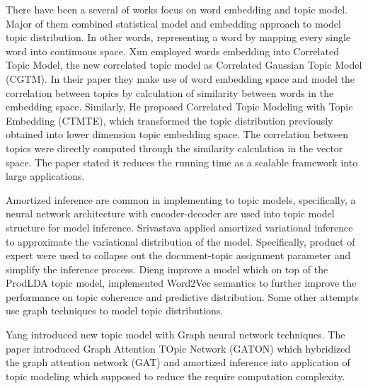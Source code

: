 There have been a several of works focus on word embedding and topic model. Major of them combined statistical model and embedding approach to model topic distribution. In other words, representing a word by mapping every single word into continuous space.
Xun \cite{he_efficient_2017} employed words embedding into Correlated Topic Model, the new correlated topic model as Correlated Gaussian Topic Model (CGTM). In their paper they make use of word embedding space and model the correlation between topics by calculation of similarity between words in the embedding space.
Similarly, He\cite{xun_correlated_nodate} proposed Correlated Topic Modeling with Topic Embedding (CTMTE), which transformed the topic distribution previously obtained into lower dimension topic embedding space. The correlation between topics were directly computed through the similarity calculation in the vector space. The paper stated it reduces the running time as a scalable framework into large applications.

Amortized inference are common in implementing to topic models, specifically, a neural network architecture with encoder-decoder are used into topic model structure for model inference.
Srivastava \cite{srivastava_autoencoding_2017} applied amortized variational inference to approximate the variational distribution of the model. Specifically, product of expert were used to collapse out the document-topic assignment parameter and simplify the inference process.
Dieng \cite{dieng_topic_2019} improve a model which on top of the ProdLDA topic model, implemented Word2Vec semantics to further improve the performance on topic coherence and predictive distribution.
Some other attempts use graph techniques to model topic distributions.

Yang\cite{yang_graph_2020} introduced new topic model with Graph neural network techniques. The paper introduced Graph Attention TOpic Network (GATON) which hybridized the graph attention network (GAT) and amortized inference into application of topic modeling which supposed to reduce the require computation complexity.

